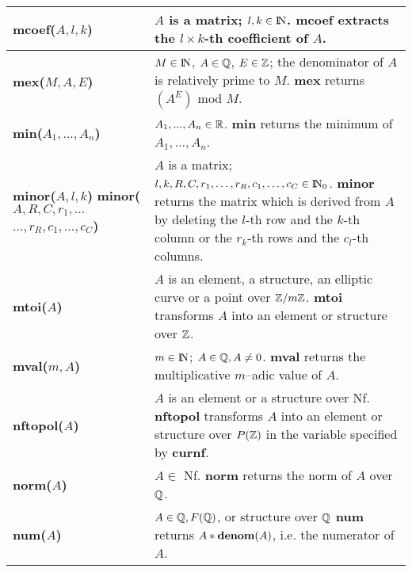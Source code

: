 {\begin{tabular}{|p{1.95in}|p{3.83in}|}
{\bf mcoef($A,l,k$)} &
$A$ is a matrix; $l,k\in {\rm{I\!N}}$.\newline
{\bf mcoef} extracts the $l\times k$-th coefficient of $A$.\\ \hline

{\bf mex($M,A,E$)} &
$M \in {\rm{I\!N}}$, $A \in \mbox{$\mathbb Q$}$, $E \in \mbox{$\mathbb Z$}$; the denominator of $A$ is relatively prime to $M$.\newline
{\bf mex} returns $(A^E)$ mod $M$.\\ \hline

{\bf min($A_1,...,A_n$)} &
$A_1,...,A_n\in\mbox{$\mathbb R$}$.\newline
{\bf min} returns the minimum of $A_1,...,A_n$.\\ \hline

{\bf minor($A,l,k$)}\newline
{\bf minor($A,R,C,r_1,\ldots $}\newline
\hspace*{0.6cm} {\bf $\ldots, r_R, c_1, \ldots, c_C$)} &
$A$ is a matrix; $l,k,R,C,r_1,\ldots ,r_R,c_1,\ldots ,c_C \in {\rm{I\!N}}_0$.\newline
{\bf minor} returns the matrix which is derived from $A$ by deleting
the $l$-th row and the $k$-th column or the $r_k$-th rows and the
$c_l$-th columns.\\ \hline

{\bf mtoi($A$)} &
$A$ is an element, a structure, an elliptic curve or a point over $\mbox{$\mathbb Z$}/m\mbox{$\mathbb Z$}$.\newline
{\bf mtoi} transforms $A$ into an element or structure over $\mbox{$\mathbb Z$}$. \\ \hline

{\bf mval($m,A$)} &
$m \in {\rm{I\!N}}$; $A \in \mbox{$\mathbb Q$}, A \neq 0$.\newline
{\bf mval} returns the multiplicative $m$--adic value of $A$. \\ \hline

{\bf nftopol($A$)} &
$A$ is an element or a structure over Nf.\newline
{\bf nftopol} transforms $A$ into an element or structure over $P(\mbox{$\mathbb Z$})$ in the
variable specified by {\bf curnf}. \\ \hline

{\bf norm($A$)} &
$A \in$ Nf.\newline
{\bf norm} returns the norm of $A$ over $\mbox{$\mathbb Q$}$.\\ \hline

{\bf num($A$)} &
$A \in \mbox{$\mathbb Q$}, F(\mbox{$\mathbb Q$})$, or structure over $\mbox{$\mathbb Q$}$\newline
{\bf num} returns $A * {\rm {\bf denom}}(A)$, i.e. the numerator of $A$.\\ \hline


\end{tabular}}
